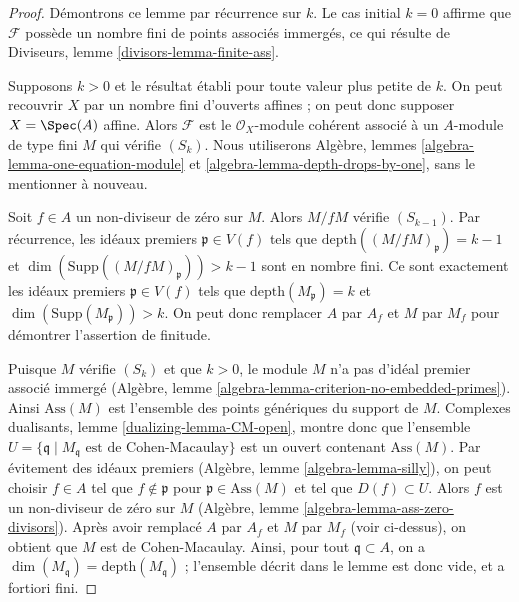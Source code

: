 \begin{proof}
Démontrons ce lemme par récurrence sur $k$. Le cas initial $k = 0$ affirme que $\mathcal{F}$ possède un nombre fini de points associés immergés, ce qui résulte de Diviseurs, lemme \ref{divisors-lemma-finite-ass}.

\medskip\noindent
Supposons $k > 0$ et le résultat établi pour toute valeur plus petite de $k$. On peut recouvrir $X$ par un nombre fini d'ouverts affines ; on peut donc supposer $X = \Spec(A)$ affine. Alors $\mathcal{F}$ est le $\mathcal{O}_X$-module cohérent associé à un $A$-module de type fini $M$ qui vérifie $(S_k)$. Nous utiliserons Algèbre, lemmes \ref{algebra-lemma-one-equation-module} et \ref{algebra-lemma-depth-drops-by-one}, sans le mentionner à nouveau.

\medskip\noindent
Soit $f \in A$ un non-diviseur de zéro sur $M$. Alors $M/fM$ vérifie $(S_{k - 1})$. Par récurrence, les idéaux premiers $\mathfrak p \in V(f)$ tels que $\text{depth}((M/fM)_\mathfrak p) = k - 1$ et $\dim(\text{Supp}((M/fM)_\mathfrak p)) > k - 1$ sont en nombre fini. Ce sont exactement les idéaux premiers $\mathfrak p \in V(f)$ tels que $\text{depth}(M_\mathfrak p) = k$ et $\dim(\text{Supp}(M_\mathfrak p)) > k$. On peut donc remplacer $A$ par $A_f$ et $M$ par $M_f$ pour démontrer l'assertion de finitude.

\medskip\noindent
Puisque $M$ vérifie $(S_k)$ et que $k > 0$, le module $M$ n'a pas d'idéal premier associé immergé (Algèbre, lemme \ref{algebra-lemma-criterion-no-embedded-primes}). Ainsi $\text{Ass}(M)$ est l'ensemble des points génériques du support de $M$. Complexes dualisants, lemme \ref{dualizing-lemma-CM-open}, montre donc que l'ensemble $U = \{\mathfrak q \mid M_\mathfrak q\text{ est de Cohen-Macaulay}\}$ est un ouvert contenant $\text{Ass}(M)$. Par évitement des idéaux premiers (Algèbre, lemme \ref{algebra-lemma-silly}), on peut choisir $f \in A$ tel que $f \not \in \mathfrak p$ pour $\mathfrak p \in \text{Ass}(M)$ et tel que $D(f) \subset U$. Alors $f$ est un non-diviseur de zéro sur $M$ (Algèbre, lemme \ref{algebra-lemma-ass-zero-divisors}). Après avoir remplacé $A$ par $A_f$ et $M$ par $M_f$ (voir ci-dessus), on obtient que $M$ est de Cohen-Macaulay. Ainsi, pour tout $\mathfrak q \subset A$, on a $\dim(M_\mathfrak q) = \text{depth}(M_\mathfrak q)$ ; l'ensemble décrit dans le lemme est donc vide, et a fortiori fini.
\end{proof}

